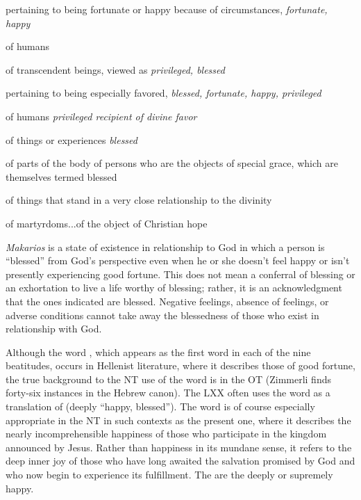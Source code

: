 				\begin{compactdesc}
					\item[BDAG 541b] \textbf{}
						\begin{compactitem}
							\item[1] pertaining to being fortunate or happy because of circumstances, \textit{fortunate, happy}
							\item[1a] of humans
							\item[1b] of transcendent beings, viewed as \textit{privileged, blessed}
							\item[2] pertaining to being especially favored, \textit{blessed, fortunate, happy, privileged}
							\item[2a] of humans \textit{privileged recipient of divine favor}
							\item[2b] of things or experiences \textit{blessed}
							\item[2b$\alpha$] of parts of the body of persons who are the objects of special grace, which are themselves termed blessed
							\item[2b$\beta$] of things that stand in a very close relationship to the divinity
							\item[2b$\gamma$] of martyrdoms...of the object of Christian hope
						\end{compactitem}
					\item[NIVAC NT 01 291--292] \textit{Makarios} is a state of existence in relationship to God in which a person is ``blessed'' from God's perspective even when he or she doesn't feel happy or isn't presently experiencing good fortune. This does not mean a conferral of blessing or an exhortation to live a life worthy of blessing; rather, it is an acknowledgment that the ones indicated are blessed. Negative feelings, absence of feelings, or adverse conditions cannot take away the blessedness of those who exist in relationship with God.
					\item[WBC 33a 91] Although the word , which appears as the first word in each of the nine beatitudes, occurs in Hellenist literature, where it describes those of good fortune, the true background to the NT use of the word is in the OT (Zimmerli finds forty-six instances in the Hebrew canon). The LXX often uses the word as a translation of  (deeply ``happy, blessed''). The word is of course especially appropriate in the NT in such contexts as the present one, where it describes the nearly incomprehensible happiness of those who participate in the kingdom announced by Jesus. Rather than happiness in its mundane sense, it refers to the deep inner joy of those who have long awaited the salvation promised by God and who now begin to experience its fulfillment. The  are the deeply or supremely happy.
				\end{compactdesc}
				
